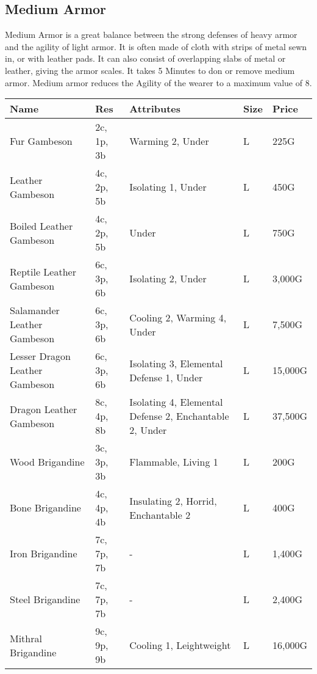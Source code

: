 \subsection{Medium Armor}
Medium Armor is a great balance between the strong defenses of heavy armor and the agility of light armor. It is often made of cloth with strips of metal sewn in, or with leather pads. It can also consist of overlapping slabs of metal or leather, giving the armor scales. It takes 5 Minutes to don or remove medium armor. Medium armor reduces the Agility of the wearer to a maximum value of 8.
\begin{longtable}{p{3.5cm} | p{1.5cm} | p{5cm} | p{1cm} | p{1.25cm}}
	Name & Res & Attributes & Size & Price\\ \hline
	
	Fur Gambeson & 2c, 1p, 3b & Warming 2, Under & L & 225G\\
	
	Leather Gambeson & 4c, 2p, 5b & Isolating 1, Under & L & 450G\\
	
	Boiled Leather Gambeson & 4c, 2p, 5b & Under & L & 750G\\
	
	Reptile Leather Gambeson & 6c, 3p, 6b & Isolating 2, Under & L & 3,000G\\
	
	Salamander Leather Gambeson & 6c, 3p, 6b & Cooling 2, Warming 4, Under & L & 7,500G\\
	
	Lesser Dragon Leather Gambeson & 6c, 3p, 6b & Isolating 3, Elemental Defense 1, Under & L & 15,000G\\
	
	Dragon Leather Gambeson & 8c, 4p, 8b & Isolating 4, Elemental Defense 2, Enchantable 2, Under & L & 37,500G\\
	
	Wood Brigandine & 3c, 3p, 3b & Flammable, Living 1 & L & 200G\\
	
	Bone Brigandine & 4c, 4p, 4b & Insulating 2, Horrid, Enchantable 2 & L & 400G\\
	
	Iron Brigandine & 7c, 7p, 7b & - & L & 1,400G\\
	
	Steel Brigandine & 7c, 7p, 7b & - & L & 2,400G\\
	
	Mithral Brigandine & 9c, 9p, 9b & Cooling 1, Leightweight & L & 16,000G\\
	

\end{longtable}
